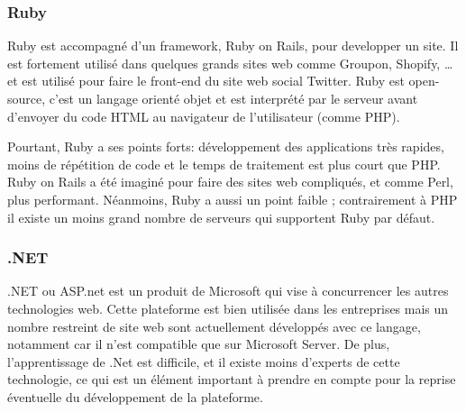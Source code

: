         \subsubsection{Ruby}
        \label{subsubsec:ruby}
        Ruby est accompagné d’un framework, Ruby on Rails, pour developper un site. Il est
        fortement utilisé dans quelques grands sites web comme Groupon, Shopify, … et est utilisé pour faire
        le front-end du site web social Twitter. Ruby est open-source, c’est un langage orienté objet et est
        interprété par le serveur avant d’envoyer du code HTML au navigateur de l’utilisateur (comme PHP).

        Pourtant, Ruby a ses points forts: développement des applications très rapides, moins de répétition
        de code et le temps de traitement est plus court que PHP. Ruby on Rails a été imaginé pour faire des
        sites web compliqués, et comme Perl, plus performant. Néanmoins, Ruby a aussi un point faible ;
        contrairement à PHP il existe un moins grand nombre de serveurs qui supportent Ruby par défaut.

        \subsubsection{.NET}
        \label{subsubsec:dotnet}
        .NET ou ASP.net est un produit de Microsoft qui vise à concurrencer les autres technologies web. Cette plateforme est bien utilisée dans les entreprises mais un nombre restreint de site web sont actuellement développés avec ce langage, notamment car il n’est compatible que sur Microsoft Server. De plus, l’apprentissage de .Net est difficile, et il existe moins d’experts de cette technologie, ce qui est un élément important à prendre en compte pour la reprise éventuelle du développement de la plateforme.



